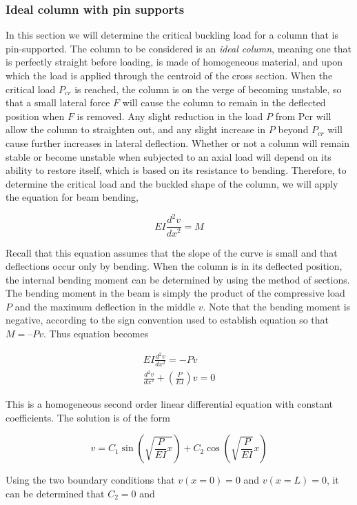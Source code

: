 \documentclass[a4paper,openany,nobib]{tufte-book}
\begin{document}
{{\subsubsection{Ideal column with pin supports}
\label{ideal-column-with-pin-supports}
In this section we will determine the critical buckling load for a
column that is pin-supported. The column to be considered is an \emph{ideal
column}, meaning one that is perfectly straight before loading, is made
of homogeneous material, and upon which the load is applied through the
centroid of the cross section. When the critical load \(P_{cr}\) is
reached, the column is on the verge of becoming unstable, so that a
small lateral force \(F\) will cause the column to remain in the deflected
position when \(F\) is removed. Any slight reduction in the load \(P\) from
Pcr will allow the column to straighten out, and any slight increase in
\(P\) beyond \(P_{cr}\) will cause further increases in lateral deflection.
Whether or not a column will remain stable or become unstable when
subjected to an axial load will depend on its ability to restore itself,
which is based on its resistance to bending. Therefore, to determine the
critical load and the buckled shape of the column, we will apply the
equation for beam bending,

$$EI\frac{d^2v}{dx^2} = M$$

Recall that this equation assumes that the slope of the curve is small
and that deflections occur only by bending. When the column is in its
deflected position, the internal bending moment can be determined by
using the method of sections. The bending moment in the beam is simply
the product of the compressive load \(P\) and the maximum deflection in
the middle \(v\). Note that the bending moment is negative, according to
the sign convention used to establish equation so that \(M = –Pv\). Thus
equation becomes


$$\begin{gathered}
    EI\frac{d^2v}{dx^2} =  - Pv \\
    \frac{d^2v}{dx^2} + \left( \frac{P}{EI} \right)v = 0 
  \end{gathered}$$

This is a homogeneous second order linear differential equation with
constant coefficients. The solution is of the form

$$ v = C_1\sin \left( \sqrt {\frac{P}{EI} x} \right) + C_2\cos \left( \sqrt {\frac{P}{EI}} x \right)$$

Using the two boundary conditions that \(v(x = 0) = 0\) and
\(v(x = L) = 0\), it can be determined that \(C_2 = 0\) and

}}
\end{document}
